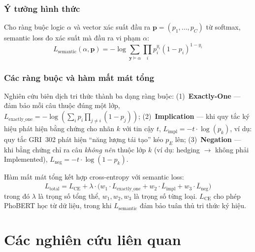 \subsubsection{Ý tưởng hình thức}

Cho ràng buộc logic $\alpha$ và vector xác suất đầu ra $\mathbf{p} = (p_1, \ldots, p_C)$ từ softmax, semantic loss đo xác suất mà đầu ra vi phạm $\alpha$:
\begin{equation}
    L_{\text{semantic}}(\alpha, \mathbf{p}) = -\log \sum_{\mathbf{y} \models \alpha} \prod_{i} p_i^{y_i}(1-p_i)^{1-y_i}
    \label{eq:semantic_loss_general}
\end{equation}

\subsubsection{Các ràng buộc và hàm mất mát tổng}

Nghiên cứu biên dịch tri thức thành ba dạng ràng buộc: (1)~\textbf{Exactly-One} --- đảm bảo mỗi câu thuộc đúng một lớp, $L_{\text{exactly\_one}} = -\log\left(\sum_i p_i \prod_{j \neq i}(1-p_j)\right)$; (2)~\textbf{Implication} --- khi quy tắc ký hiệu phát hiện bằng chứng cho nhãn $k$ với tin cậy $t$, $L_{\text{impl}} = -t \cdot \log(p_k)$, ví dụ: quy tắc GRI~302 phát hiện ``năng lượng tái tạo'' kéo $p_E$ lên; (3)~\textbf{Negation} --- khi bằng chứng chỉ ra câu \textit{không nên} thuộc lớp $k$ (ví dụ: hedging $\to$ không phải Implemented), $L_{\text{neg}} = -t \cdot \log(1-p_k)$.

Hàm mất mát tổng kết hợp cross-entropy với semantic loss:
\begin{equation}
    L_{\text{total}} = L_{\text{CE}} + \lambda \cdot \Big(w_1 \cdot L_{\text{exactly\_one}} + w_2 \cdot \overline{L}_{\text{impl}} + w_3 \cdot \overline{L}_{\text{neg}}\Big)
    \label{eq:total_loss}
\end{equation}
trong đó $\lambda$ là trọng số tổng thể, $w_1, w_2, w_3$ là trọng số từng loại. $L_{\text{CE}}$ cho phép PhoBERT học từ dữ liệu, trong khi $L_{\text{semantic}}$ đảm bảo tuân thủ tri thức ký hiệu.


\section{Các nghiên cứu liên quan}
\label{sec:related_works}

